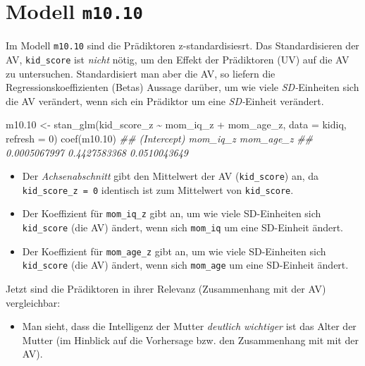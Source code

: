 \documentclass[
  a4paper,
  DIV=11]{scrreprt}
\newenvironment{Shaded}{\begin{snugshade}}{\end{snugshade}}
\newcommand{\AttributeTok}[1]{\textcolor[rgb]{0.40,0.45,0.13}{#1}}
\newcommand{\DecValTok}[1]{\textcolor[rgb]{0.68,0.00,0.00}{#1}}
\newcommand{\DocumentationTok}[1]{\textcolor[rgb]{0.37,0.37,0.37}{\textit{#1}}}
\newcommand{\FloatTok}[1]{\textcolor[rgb]{0.68,0.00,0.00}{#1}}
\newcommand{\FunctionTok}[1]{\textcolor[rgb]{0.28,0.35,0.67}{#1}}
\newcommand{\NormalTok}[1]{\textcolor[rgb]{0.00,0.23,0.31}{#1}}
\newcommand{\OtherTok}[1]{\textcolor[rgb]{0.00,0.23,0.31}{#1}}
\newcommand{\SpecialCharTok}[1]{\textcolor[rgb]{0.37,0.37,0.37}{#1}}
\providecommand{\tightlist}{%
  \setlength{\itemsep}{0pt}\setlength{\parskip}{0pt}}\usepackage{longtable,booktabs,array}
\theoremstyle{definition}
\theoremstyle{remark}
\begin{document}
\hypertarget{modell-m10.10}{%
\section{\texorpdfstring{Modell
\texttt{m10.10}}{Modell m10.10}}\label{modell-m10.10}}

Im Modell \texttt{m10.10} sind die Prädiktoren z-standardisiesrt. Das
Standardisieren der AV, \texttt{kid\_score} ist \emph{nicht} nötig, um
den Effekt der Prädiktoren (UV) auf die AV zu untersuchen.
Standardisiert man aber die AV, so liefern die Regressionskoeffizienten
(Betas) Aussage darüber, um wie viele \emph{SD-}Einheiten sich die AV
verändert, wenn sich ein Prädiktor um eine \emph{SD-}Einheit verändert.

\begin{Shaded}
\begin{Highlighting}[]
\NormalTok{m10}\FloatTok{.10} \OtherTok{\textless{}{-}} \FunctionTok{stan\_glm}\NormalTok{(kid\_score\_z }\SpecialCharTok{\textasciitilde{}}\NormalTok{ mom\_iq\_z }\SpecialCharTok{+}\NormalTok{ mom\_age\_z, }
                   \AttributeTok{data =}\NormalTok{ kidiq, }
                   \AttributeTok{refresh =} \DecValTok{0}\NormalTok{)}
\FunctionTok{coef}\NormalTok{(m10}\FloatTok{.10}\NormalTok{)}
\DocumentationTok{\#\#  (Intercept)     mom\_iq\_z    mom\_age\_z }
\DocumentationTok{\#\# 0.0005067997 0.4427583368 0.0510043649}
\end{Highlighting}
\end{Shaded}

\begin{itemize}
\tightlist
\item
  Der \emph{Achsenabschnitt} gibt den Mittelwert der AV
  (\texttt{kid\_score}) an, da \texttt{kid\_score\_z\ =\ 0} identisch
  ist zum Mittelwert von \texttt{kid\_score}.
\item
  Der Koeffizient für \texttt{mom\_iq\_z} gibt an, um wie viele
  SD-Einheiten sich \texttt{kid\_score} (die AV) ändert, wenn sich
  \texttt{mom\_iq} um eine SD-Einheit ändert.
\item
  Der Koeffizient für \texttt{mom\_age\_z} gibt an, um wie viele
  SD-Einheiten sich \texttt{kid\_score} (die AV) ändert, wenn sich
  \texttt{mom\_age} um eine SD-Einheit ändert.
\end{itemize}

Jetzt sind die Prädiktoren in ihrer Relevanz (Zusammenhang mit der AV)
vergleichbar:

\begin{itemize}
\tightlist
\item
  Man sieht, dass die Intelligenz der Mutter \emph{deutlich wichtiger}
  ist das Alter der Mutter (im Hinblick auf die Vorhersage bzw. den
  Zusammenhang mit mit der AV).
\end{itemize}
\end{document}
